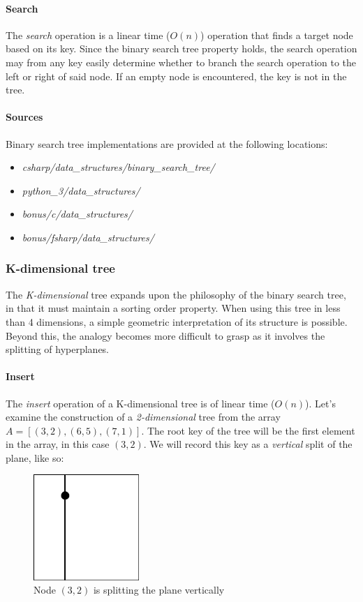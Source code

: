 \documentclass{article}
\begin{document}
\paragraph{Search}
The {\em search} operation is a linear time (\(O(n)\)) operation that finds a target node based on its key.
Since the binary search tree property holds, the search operation may from any key easily determine whether to
branch the search operation to the left or right of said node. If an empty node is encountered, the key is
not in the tree.

\paragraph{Sources}
Binary search tree implementations are provided at the following locations:
\begin{itemize}
\item{{\em csharp/data\_structures/binary\_search\_tree/}}
\item{{\em python\_3/data\_structures/}}
\item{{\em bonus/c/data\_structures/}}
\item{{\em bonus/fsharp/data\_structures/}}
\end{itemize}


\subsubsection{K-dimensional tree}
The {\em K-dimensional} tree expands upon the philosophy of the binary search tree, in that it
must maintain a sorting order property. When using this tree in less than 4 dimensions,
a simple geometric interpretation of its structure is possible. Beyond this, the analogy becomes
more difficult to grasp as it involves the splitting of hyperplanes.

\paragraph{Insert}
The {\em insert} operation of a K-dimensional tree is of linear time (\(O(n)\)).
Let's examine the construction of a {\em 2-dimensional} tree from the array \(A = [(3, 2), (6, 5), (7, 1)]\).
The root key of the tree will be the first element in the array, in this case \((3, 2)\).
We will record this key as a {\em vertical} split of the plane, like so:

\begin{figure}[H]
  \centering
  \includegraphics[width=4cm]{2d_tree_0}
  \caption{Node \((3, 2)\) is splitting the plane vertically}
\end{figure}
\end{document}
